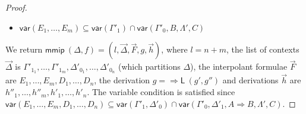 \documentclass[a4paper,UKenglish,cleveref,autoref,thm-restate, anonymous]{lipics-v2021}
\renewcommand{\vec}[1]{\overrightarrow{#1}}
\newcommand{\Rarr}{\Rightarrow}
\newcommand{\mf}[1]{\mathsf{#1}}
\newcommand{\vars}[1]{\mf{var} (#1)}
\newcommand{\GG}{\Gamma}
\newcommand{\GD}{\Delta}
\newcommand{\GL}{\Lambda}
\newcommand{\Rl}{{\Rarr}\mathsf{L}}
\begin{document}
\begin{proof}
\begin{itemize}
  \item $\vars{E_1 , \dots, E_m} \subseteq \vars{\GG'_1} \cap \vars{\GG'_0 , B , \GL' , C}$
  \end{itemize}
  We return $\mf{mmip}\ (\GD,f) = (l,\vec{\GD},\vec{F},g,\vec{h})$, where $l = n+m$,  the list of contexts $\vec{\GD}$ is $\GG'_{1_1}, \dots , \GG'_{1_m}, \GD'_{0_1}, \dots , \GD'_{0_n}$ (which partitions $\GD$), the interpolant formulae $\vec{F}$ are $E_1 , \dots, E_m, D_1,\dots, D_n$, the derivation $g = \Rl \ (g' , g'')$ and derivations $\vec{h}$ are $h''_1, \dots, h''_m, h'_1, \dots, h'_n$.
  The variable condition is satisfied since $\vars{E_1,\dots,E_m,D_1,\dots,D_n} \subseteq \vars{\GG'_1,\GD'_0} \cap \vars{\GG'_0,\GD'_1,A\Rarr B,\GL',C}$.


\end{proof}
\end{document}
